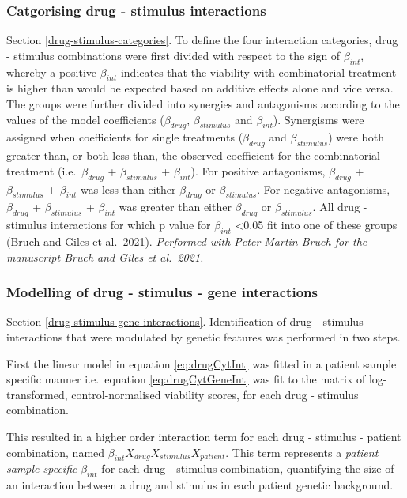 \documentclass[11pt, a4paper, twosided]{book}
\begin{document}
\hypertarget{drug-stimulus-categories-method}{%
\subsubsection{Catgorising drug - stimulus interactions}\label{drug-stimulus-categories-method}}

Section \ref{drug-stimulus-categories}. To define the four interaction categories, drug - stimulus combinations were first divided with respect to the sign of \(\beta_{int}\), whereby a positive \(\beta_{int}\) indicates that the viability with combinatorial treatment is higher than would be expected based on additive effects alone and vice versa. The groups were further divided into synergies and antagonisms according to the values of the model coefficients (\(\beta_{drug}\), \(\beta_{stimulus}\) and \(\beta_{int}\)). Synergisms were assigned when coefficients for single treatments (\(\beta_{drug}\) and \(\beta_{stimulus}\)) were both greater than, or both less than, the observed coefficient for the combinatorial treatment (i.e.~\(\beta_{drug}\) + \(\beta_{stimulus}\) + \(\beta_{int}\)). For positive antagonisms, \(\beta_{drug}\) + \(\beta_{stimulus}\) + \(\beta_{int}\) was less than either \(\beta_{drug}\) or \(\beta_{stimulus}\). For negative antagonisms, \(\beta_{drug}\) + \(\beta_{stimulus}\) + \(\beta_{int}\) was greater than either \(\beta_{drug}\) or \(\beta_{stimulus}\). All drug - stimulus interactions for which p value for \(\beta_{int}\) \textless0.05 fit into one of these groups (Bruch and Giles et al.~2021). \emph{Performed with Peter-Martin Bruch for the manuscript Bruch and Giles et al.~2021.}

\hypertarget{drug-stimulus-gene-interactions-method}{%
\subsubsection{Modelling of drug - stimulus - gene interactions}\label{drug-stimulus-gene-interactions-method}}

Section \ref{drug-stimulus-gene-interactions}. Identification of drug - stimulus interactions that were modulated by genetic features was performed in two steps.

First the linear model in equation \eqref{eq:drugCytInt} was fitted in a patient sample specific manner i.e.~equation \eqref{eq:drugCytGeneInt} was fit to the matrix of log-transformed, control-normalised viability scores, for each drug - stimulus combination.

This resulted in a higher order interaction term for each drug - stimulus - patient combination, named \(\beta_{int}X_{drug}X_{stimulus}X_{patient}\). This term represents a \emph{patient sample-specific} \(\beta_{int}\) for each drug - stimulus combination, quantifying the size of an interaction between a drug and stimulus in each patient genetic background.
\end{document}
